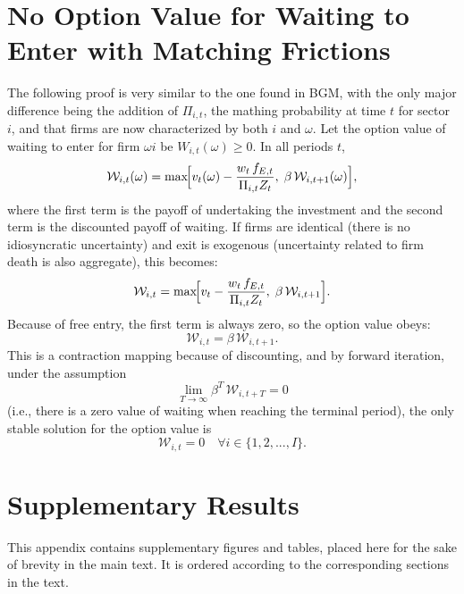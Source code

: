 \documentclass[a4paper,12pt]{article} %
\numberwithin{equation}{section} %
\numberwithin{figure}{section}
\numberwithin{table}{section}
\begin{document}
\begin{refsection}
\begin{appendices}
\pagebreak
\section{No Option Value for Waiting to Enter with Matching Frictions}
\label{sec-app:option}

The following proof is very similar to the one found in BGM, with the only major difference being the addition of $\Pi_{i,t}$,
the mathing probability at time $t$ for sector $i$, and that firms are now characterized by both $i$ and $\omega$.
Let the option value of waiting to enter for firm $\omega i$ be $W_{i,t}(\omega)\ge0$. In all periods $t$,
\[
\mathcal{W}_{i,t}(\omega)
=\max\!\Bigl[v_t(\omega)-\frac{w_t\,f_{E,t}}{\Pi_{i,t}Z_t},\;\beta\,\mathcal{W}_{i,t+1}(\omega)\Bigr],
\]
where the first term is the payoff of undertaking the investment and the second term is the discounted payoff of waiting. 
If firms are identical (there is no idiosyncratic uncertainty) and exit is exogenous (uncertainty related to firm death is also aggregate), this becomes:
\[
\mathcal{W}_{i,t}
=\max\!\Bigl[v_t-\frac{w_t\,f_{E,t}}{\Pi_{i,t}Z_t},\;\beta\,\mathcal{W}_{i,t+1}\Bigr].
\]
Because of free entry, the first term is always zero, so the option value obeys:
\[
\mathcal{W}_{i,t} = \beta\,\mathcal{W}_{i,t+1}.
\]
This is a contraction mapping because of discounting, and by forward iteration, under the assumption
\[
\lim_{T\to\infty}\beta^T\,\mathcal{W}_{i,t+T}=0
\]
(i.e., there is a zero value of waiting when reaching the terminal period), the only stable solution for the option value is
\[
\mathcal{W}_{i,t} = 0 \quad \forall i \in \{1,2,...,I\}.
\]

\pagebreak
\section{Supplementary Results}
\label{sec-app:sup}

This appendix contains supplementary figures and tables, placed here for the sake of brevity in the main text. It is ordered according to the corresponding sections in the text.


\newpage
\end{appendices}
\thispagestyle{plain}
\renewcommand*{\thepage}{A-\Roman{page}} %

\printbibliography[heading=subbibliography, title={Appendix References}]
\thispagestyle{plain}
\cleardoublepage %

\end{refsection}
\end{document}

